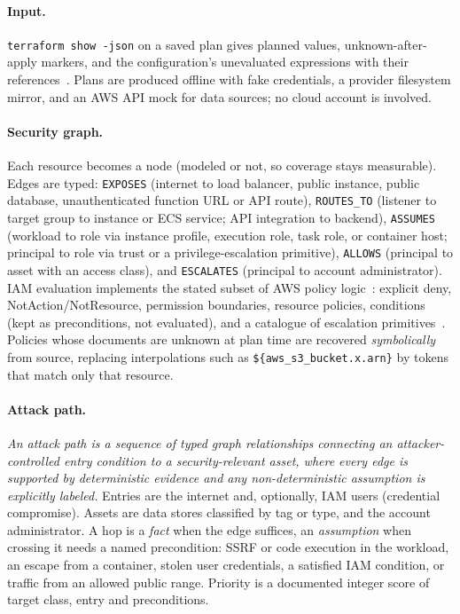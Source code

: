 \documentclass[sigconf,review,anonymous]{acmart}
\begin{document}
\paragraph{Input.} \texttt{terraform show -json} on a saved plan gives planned values, unknown-after-apply markers, and the
configuration's unevaluated expressions with their references~\cite{tf-json}. Plans are produced offline with fake
credentials, a provider filesystem mirror, and an AWS API mock for data sources; no cloud account is involved.

\paragraph{Security graph.} Each resource becomes a node (modeled or not, so coverage stays measurable). Edges are typed:
\texttt{EXPOSES} (internet to load balancer, public instance, public database, unauthenticated function URL or API route),
\texttt{ROUTES\_TO} (listener to target group to instance or ECS service; API integration to backend), \texttt{ASSUMES}
(workload to role via instance profile, execution role, task role, or container host; principal to role via trust or a
privilege-escalation primitive), \texttt{ALLOWS} (principal to asset with an access class), and \texttt{ESCALATES}
(principal to account administrator). IAM evaluation implements the stated subset of AWS policy
logic~\cite{aws-iam-eval}: explicit deny, NotAction/NotResource, permission boundaries, resource policies, conditions (kept
as preconditions, not evaluated), and a catalogue of escalation primitives~\cite{rhino-privesc,iamvulnerable}. Policies
whose documents are unknown at plan time are recovered \emph{symbolically} from source, replacing interpolations such as
\texttt{\$\{aws\_s3\_bucket.x.arn\}} by tokens that match only that resource.

\paragraph{Attack path.} \emph{An attack path is a sequence of typed graph relationships connecting an attacker-controlled
entry condition to a security-relevant asset, where every edge is supported by deterministic evidence and any
non-deterministic assumption is explicitly labeled.} Entries are the internet and, optionally, IAM users (credential
compromise). Assets are data stores classified by tag or type, and the account administrator. A hop is a \emph{fact} when the
edge suffices, an \emph{assumption} when crossing it needs a named precondition: SSRF or code execution in the
workload, an escape from a container, stolen user credentials, a satisfied IAM condition, or traffic from an allowed public
range. Priority is a documented integer score of target class, entry and preconditions.
\end{document}
